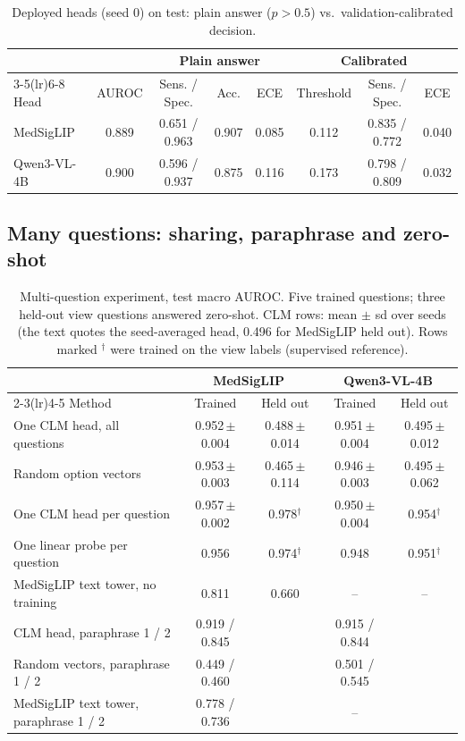 \documentclass[11pt]{article}
\newcommand{\pmsd}[2]{#1\,{\scriptsize$\pm$#2}}
\begin{document}
\begin{table}[t]
  \centering\small
  \caption{Deployed heads (seed 0) on test: plain answer ($p>0.5$) vs.\ validation-calibrated decision.}
  \label{tab:served}
  \begin{tabular}{lccccccc}
    \toprule
    & & \multicolumn{3}{c}{Plain answer} & \multicolumn{3}{c}{Calibrated} \\
    \cmidrule(lr){3-5}\cmidrule(lr){6-8}
    Head & AUROC & Sens. / Spec. & Acc. & ECE & Threshold & Sens. / Spec. & ECE \\
    \midrule
    MedSigLIP & 0.889 & 0.651 / 0.963 & 0.907 & 0.085 & 0.112 & 0.835 / 0.772 & 0.040 \\
    Qwen3-VL-4B & 0.900 & 0.596 / 0.937 & 0.875 & 0.116 & 0.173 & 0.798 / 0.809 & 0.032 \\
    \bottomrule
  \end{tabular}
\end{table}

\subsection{Many questions: sharing, paraphrase and zero-shot}
\label{sec:multiq}

\begin{table}[t]
  \centering\small
  \caption{Multi-question experiment, test macro AUROC. Five trained questions; three held-out view questions
  answered zero-shot. CLM rows: mean $\pm$ sd over seeds (the text quotes the seed-averaged head, 0.496 for
  MedSigLIP held out). Rows marked $^{\dagger}$ were trained on the view labels (supervised reference).}
  \label{tab:multiq}
  \begin{tabular}{lcccc}
    \toprule
    & \multicolumn{2}{c}{MedSigLIP} & \multicolumn{2}{c}{Qwen3-VL-4B} \\
    \cmidrule(lr){2-3}\cmidrule(lr){4-5}
    Method & Trained & Held out & Trained & Held out \\
    \midrule
    One CLM head, all questions & \pmsd{0.952}{0.004} & \pmsd{0.488}{0.014} & \pmsd{0.951}{0.004} & \pmsd{0.495}{0.012} \\
    Random option vectors & \pmsd{0.953}{0.003} & \pmsd{0.465}{0.114} & \pmsd{0.946}{0.003} & \pmsd{0.495}{0.062} \\
    One CLM head per question & \pmsd{0.957}{0.002} & 0.978$^{\dagger}$ & \pmsd{0.950}{0.004} & 0.954$^{\dagger}$ \\
    One linear probe per question & 0.956 & 0.974$^{\dagger}$ & 0.948 & 0.951$^{\dagger}$ \\
    MedSigLIP text tower, no training & 0.811 & 0.660 & -- & -- \\
    \midrule
    CLM head, paraphrase 1 / 2 & 0.919 / 0.845 & & 0.915 / 0.844 & \\
    Random vectors, paraphrase 1 / 2 & 0.449 / 0.460 & & 0.501 / 0.545 & \\
    MedSigLIP text tower, paraphrase 1 / 2 & 0.778 / 0.736 & & -- & \\
    \bottomrule
  \end{tabular}
\end{table}
\end{document}
